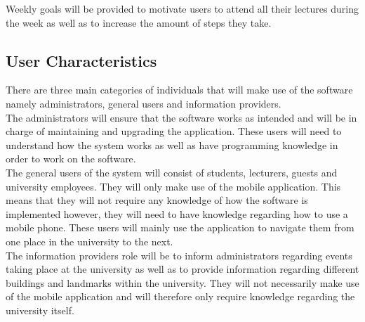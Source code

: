 \documentclass[12pt,a4paper]{report}
\begin{document}
Weekly goals will be provided to motivate users to attend all their lectures during the week as well as to increase the amount of steps they take.

\subsection*{User Characteristics}
There are three main categories of individuals that will make use of the software namely administrators, general users and information providers.
	\\		

		
	The administrators will ensure that the software works as intended and will be in charge of maintaining and upgrading the application. These users will need to understand how the system works as well as have programming knowledge in order to work on the software.  
	\\

	The general users of the system will consist of students, lecturers, guests and university employees. They will only make use of the mobile application. This means that they will not require any knowledge of how the software is implemented however, they will need to have knowledge regarding how to use a mobile phone. These users will mainly use the application to navigate them from one place in the university to the next.
	\\

	The information providers role will be to inform administrators regarding events taking place at the university as well as to provide information regarding different buildings and landmarks within the university. They will not necessarily make use of the mobile application and will therefore only require knowledge regarding the university itself.
	
\end{document}
